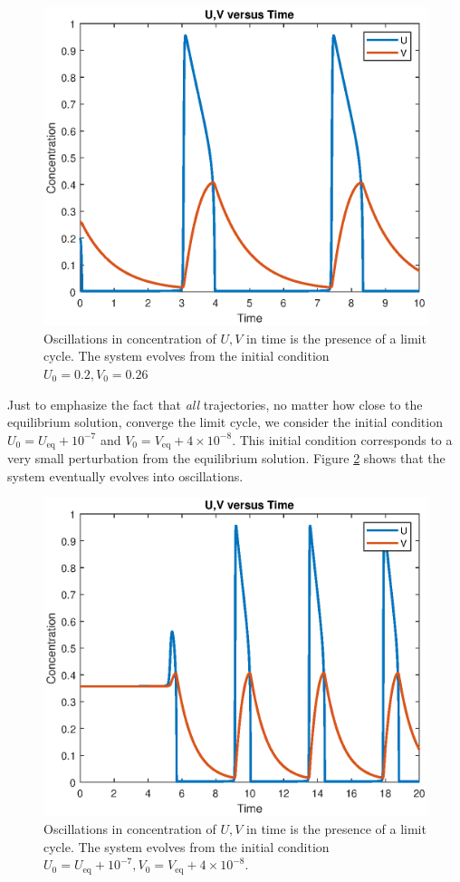 \documentclass[twocolumn,amsmath,amssymb,aps]{revtex4}
\begin{document}
\begin{figure}[!htb]
	\centering
	\includegraphics[scale=0.5]{UV_Time.eps}
	\caption{Oscillations in concentration of $U,V$ in time is the presence of a limit cycle. The system evolves from the initial condition $U_0 = 0.2, V_0 = 0.26$}
	\label{fig:UVTime}
\end{figure}


Just to emphasize the fact that \textit{all} trajectories, no matter how close to the equilibrium solution, converge the limit cycle, we consider the initial condition $U_0 = U_{\text{eq}} + 10^{-7}$ and $V_0 = V_{\text{eq}} + 4\times 10^{-8}$. This initial condition corresponds to a very small perturbation from the equilibrium solution. Figure \ref{fig:Perturbed} shows that the system eventually evolves into oscillations. 

\begin{figure}[!htb]
	\centering
	\includegraphics[scale=0.5]{perturbed.eps}
	\caption{Oscillations in concentration of $U,V$ in time is the presence of a limit cycle. The system evolves from the initial condition $U_0 = U_{\text{eq}} + 10^{-7}, V_0 = V_{\text{eq}} + 4\times 10^{-8}$.}
	\label{fig:Perturbed}
\end{figure}
\end{document}
